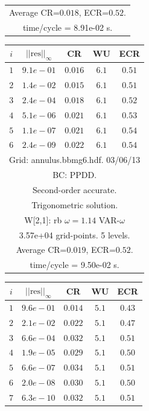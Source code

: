 \begin{table}[hbt]
\begin{center}
{\begin{tabular}{|c|c|c|c|c|}
\multicolumn{5}{|c|}{Average CR=$0.018$, ECR=$0.52$.}  \\
\multicolumn{5}{|c|}{time/cycle = 8.91e-02 s.}  \\
\hline 
\end{tabular}
\begin{tabular}{|c|c|c|c|c|} \hline 
 $i$   & $\vert\vert\mbox{res}\vert\vert_\infty$  &  CR     &  WU    & ECR  \\   \hline 
 $ 1$  & $ 9.1e-01$ & $0.016$ & $ 6.1$ & $0.51$ \\ 
 $ 2$  & $ 1.4e-02$ & $0.015$ & $ 6.1$ & $0.51$ \\ 
 $ 3$  & $ 2.4e-04$ & $0.018$ & $ 6.1$ & $0.52$ \\ 
 $ 4$  & $ 5.1e-06$ & $0.021$ & $ 6.1$ & $0.53$ \\ 
 $ 5$  & $ 1.1e-07$ & $0.021$ & $ 6.1$ & $0.54$ \\ 
 $ 6$  & $ 2.4e-09$ & $0.022$ & $ 6.1$ & $0.54$ \\ 
\hline 
\multicolumn{5}{|c|}{Grid: annulus.bbmg6.hdf. 03/06/13}  \\
\multicolumn{5}{|c|}{BC: PPDD.}  \\
\multicolumn{5}{|c|}{Second-order accurate.}  \\
\multicolumn{5}{|c|}{Trigonometric solution.}  \\
\multicolumn{5}{|c|}{W[2,1]: rb $\omega=1.14$ VAR-$\omega$}  \\
\multicolumn{5}{|c|}{3.57e+04 grid-points. 5 levels.}  \\
\multicolumn{5}{|c|}{Average CR=$0.019$, ECR=$0.52$.}  \\
\multicolumn{5}{|c|}{time/cycle = 9.50e-02 s.}  \\
\hline 
\end{tabular}
\begin{tabular}{|c|c|c|c|c|} \hline 
 $i$   & $\vert\vert\mbox{res}\vert\vert_\infty$  &  CR     &  WU    & ECR  \\   \hline 
 $ 1$  & $ 9.6e-01$ & $0.014$ & $ 5.1$ & $0.43$ \\ 
 $ 2$  & $ 2.1e-02$ & $0.022$ & $ 5.1$ & $0.47$ \\ 
 $ 3$  & $ 6.6e-04$ & $0.032$ & $ 5.1$ & $0.51$ \\ 
 $ 4$  & $ 1.9e-05$ & $0.029$ & $ 5.1$ & $0.50$ \\ 
 $ 5$  & $ 6.6e-07$ & $0.034$ & $ 5.1$ & $0.51$ \\ 
 $ 6$  & $ 2.0e-08$ & $0.030$ & $ 5.1$ & $0.50$ \\ 
 $ 7$  & $ 6.3e-10$ & $0.032$ & $ 5.1$ & $0.51$ \\ 

\end{tabular}}
\end{center}
\end{table}
